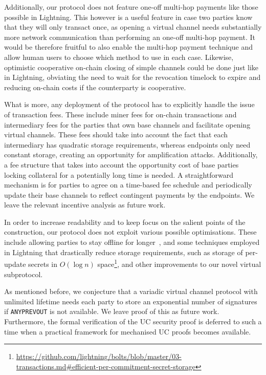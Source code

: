   Additionally, our protocol does not feature one-off multi-hop payments like
  those possible in Lightning. This however is a useful feature in case two
  parties know that they will only transact once, as opening a virtual channel
  needs substantially more network communication than performing an one-off
  multi-hop payment. It would be therefore fruitful to also enable the multi-hop
  payment technique and allow human users to choose which method to use in each
  case. Likewise, optimistic cooperative on-chain closing of simple channels
  could be done just like in Lightning, obviating the need to wait for the
  revocation timelock to expire and reducing on-chain costs if the counterparty
  is cooperative.

  What is more, any deployment of the protocol has to explicitly handle the issue
  of transaction fees. These include miner fees for on-chain transactions and
  intermediary fees for the parties that own base channels and facilitate
  opening virtual channels. These fees should take into account the fact that
  each intermediary has quadratic storage requirements, whereas endpoints only
  need constant storage, creating an opportunity for amplification attacks.
  Additionally, a fee structure that takes into account the opportunity cost of
  base parties locking collateral for a potentially long time is needed. A
  straightforward mechanism is for parties to agree on a time-based fee schedule
  and periodically update their base channels to reflect contingent payments by
  the endpoints. We leave the relevant incentive analysis as future work.

  In order to increase readability and to keep focus on the salient points of
  the construction, our protocol does not exploit various possible
  optimisations. These include allowing parties to stay offline for
  longer~\cite{DBLP:conf/ccs/AumayrTMMM22}, and some techniques employed in Lightning that
  drastically reduce storage requirements, such as storage of per-update secrets
  in $O(\log n)$
  space\footnote{\url{https://github.com/lightning/bolts/blob/master/03-transactions.md\#efficient-per-commitment-secret-storage}},
  and other improvements to our novel virtual subprotocol.

  As mentioned before, we conjecture that a variadic virtual
  channel protocol with unlimited lifetime needs each party to store an
  exponential number of signatures if \texttt{ANYPREVOUT} is not available. We
  leave proof of this as future work. Furthermore, the formal verification of
  the UC security proof is deferred to such a time when a practical framework
  for mechanised UC proofs becomes available.

